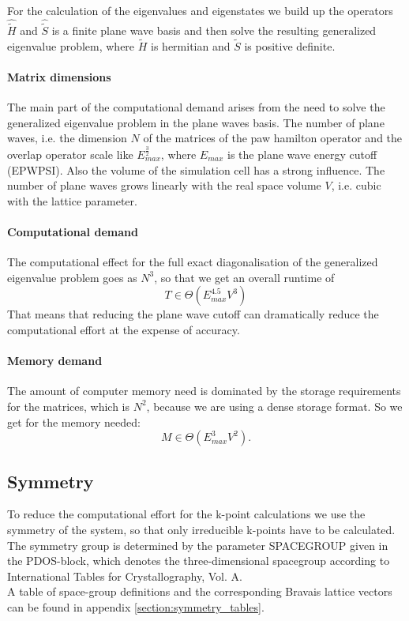 \documentclass[final,12pt]{article}
\begin{document}
{{{{{{For the calculation of the eigenvalues and eigenstates we build up the
operators $\hat{\tilde H}$ and $\hat{\tilde S}$ is a finite plane wave
basis and then solve the resulting generalized eigenvalue problem,
where $\tilde H$ is hermitian and $\tilde S$ is positive definite.

\paragraph{Matrix dimensions}
The main part of the computational demand arises from the need to solve the
generalized eigenvalue problem in the plane waves basis. The number of plane
waves, i.e. the dimension $N$ of the matrices of the paw hamilton operator and the
overlap operator scale like $E_{max}^{\frac{3}{2}}$, where $E_{max}$ is the
plane wave energy cutoff (EPWPSI). Also the volume of the simulation cell has a
strong influence. The number of plane waves grows linearly with the real space
volume $V$, i.e. cubic with the lattice parameter.
\paragraph{Computational demand}
The computational effect for the full exact diagonalisation of the generalized
eigenvalue problem goes as $N^3$, so that we get an overall runtime of
\begin{equation}
T \in \Theta(E_{max}^{4.5}V^3)
\end{equation}
That means that reducing the plane wave cutoff can dramatically reduce the
computational effort at the expense of accuracy.

\paragraph{Memory demand}
The amount of computer memory need is dominated by the storage requirements for
the matrices, which is $N^2$, because we are using a dense storage format.  So
we get for the memory needed:
\begin{equation}
  M\in \Theta(E_{max}^{3}V^2).
\end{equation}

\subsection{Symmetry}
To reduce the computational effort for the k-point calculations we use the
symmetry of the system, so that only irreducible k-points have to be calculated.
The symmetry group is determined by the parameter SPACEGROUP given in the
PDOS-block, which denotes the three-dimensional spacegroup according to
International Tables for Crystallography, Vol. A. \\
A table of space-group definitions and the corresponding Bravais lattice vectors
can be found in appendix \ref{section:symmetry_tables}.



}}}}}}
\end{document}
